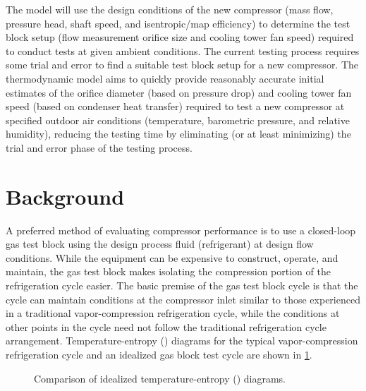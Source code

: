 The model will use the design conditions of the new compressor 
(mass flow, pressure head, shaft speed, and isentropic/map efficiency) 
to determine the test block setup 
(flow measurement orifice size and cooling tower fan speed) 
required to conduct tests at given ambient conditions. 
The current testing process requires some trial and error 
to find a suitable test block setup for a new compressor. 
The thermodynamic model aims to quickly provide reasonably accurate 
initial estimates of the orifice diameter (based on pressure drop) 
and cooling tower fan speed (based on condenser heat transfer) 
required to test a new compressor at specified outdoor air conditions
(temperature, barometric pressure, and relative humidity), 
reducing the testing time by eliminating (or at least minimizing) 
the trial and error phase of the testing process.

\section{Background} \label{sec:background}
A preferred method of evaluating compressor performance is to use a closed-loop gas test block
using the design process fluid (refrigerant) at design flow conditions. 
While the equipment can be expensive to construct, operate, and maintain, 
the gas test block makes isolating the compression portion of the refrigeration cycle easier. 
The basic premise of the gas test block cycle is that 
the cycle can maintain conditions at the compressor inlet similar to those experienced in a traditional vapor-compression refrigeration cycle, 
while the conditions at other points in the cycle need not follow the traditional refrigeration cycle arrangement. 
Temperature-entropy (\tssymb)%
%
diagrams for the typical vapor-compression refrigeration cycle 
and an idealized gas block test cycle are shown in \cref{fig:CycleComparison}. 
\begin{figure}[htbp]
  \centering
  \hfill
  \caption{Comparison of idealized temperature-entropy (\tssymb) diagrams.}
  \label{fig:CycleComparison}
\end{figure}


